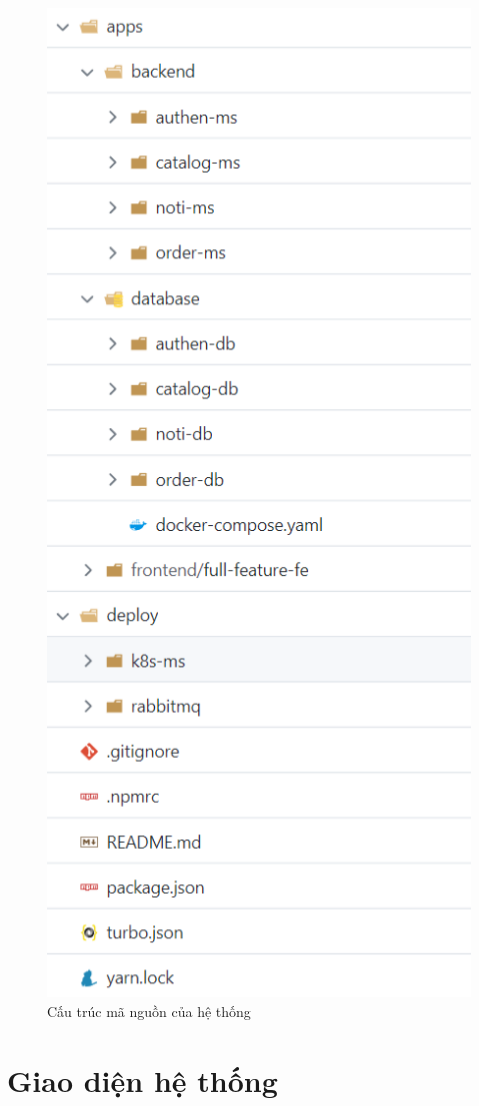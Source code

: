 \begin{figure}[H]
    \begin{center}
        \includegraphics[scale = 1.5]{images/hanh/ecomm-app-source-code.png}
        \vspace*{2mm}
    \end{center}
    \caption{Cấu trúc mã nguồn của hệ thống}
    \label{fig:ecomm_app_source_code}
\end{figure}
\section{Giao diện hệ thống}